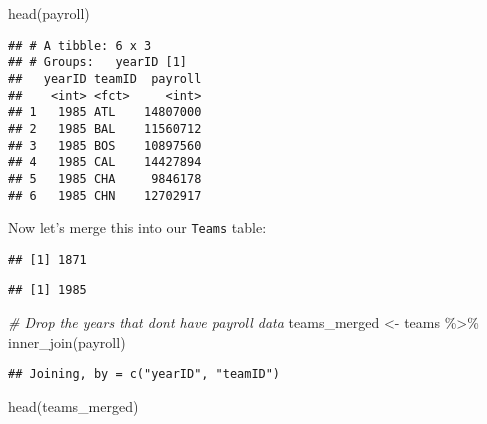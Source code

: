 \documentclass[
]{article}
\newenvironment{Shaded}{\begin{snugshade}}{\end{snugshade}}
\newcommand{\CommentTok}[1]{\textcolor[rgb]{0.56,0.35,0.01}{\textit{#1}}}
\newcommand{\FunctionTok}[1]{\textcolor[rgb]{0.00,0.00,0.00}{#1}}
\newcommand{\NormalTok}[1]{#1}
\newcommand{\OtherTok}[1]{\textcolor[rgb]{0.56,0.35,0.01}{#1}}
\newcommand{\SpecialCharTok}[1]{\textcolor[rgb]{0.00,0.00,0.00}{#1}}
\begin{document}
\begin{Shaded}
\begin{Highlighting}[]
\FunctionTok{head}\NormalTok{(payroll)}
\end{Highlighting}
\end{Shaded}

\begin{verbatim}
## # A tibble: 6 x 3
## # Groups:   yearID [1]
##   yearID teamID  payroll
##    <int> <fct>     <int>
## 1   1985 ATL    14807000
## 2   1985 BAL    11560712
## 3   1985 BOS    10897560
## 4   1985 CAL    14427894
## 5   1985 CHA     9846178
## 6   1985 CHN    12702917
\end{verbatim}

Now let's merge this into our \texttt{Teams} table:

\begin{Shaded}
\end{Shaded}

\begin{verbatim}
## [1] 1871
\end{verbatim}

\begin{Shaded}
\end{Shaded}

\begin{verbatim}
## [1] 1985
\end{verbatim}

\begin{Shaded}
\begin{Highlighting}[]
\CommentTok{\# Drop the years that don\textquotesingle{}t have payroll data}
\NormalTok{teams\_merged }\OtherTok{\textless{}{-}}\NormalTok{ teams }\SpecialCharTok{\%\textgreater{}\%} 
  \FunctionTok{inner\_join}\NormalTok{(payroll)}
\end{Highlighting}
\end{Shaded}

\begin{verbatim}
## Joining, by = c("yearID", "teamID")
\end{verbatim}

\begin{Shaded}
\begin{Highlighting}[]
\FunctionTok{head}\NormalTok{(teams\_merged)}
\end{Highlighting}
\end{Shaded}
\end{document}
